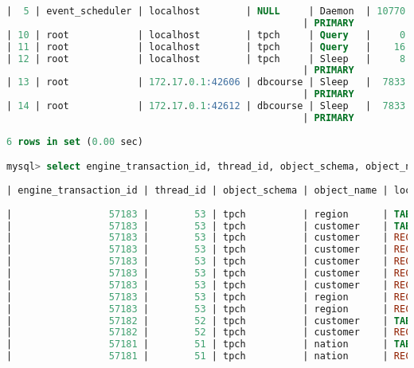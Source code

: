 \documentclass{article}
\begin{document}
\begin{lstlisting}[language=sql]
|  5 | event_scheduler | localhost        | NULL     | Daemon  | 10770 | Waiting on empty queue | NULL
                                                    | PRIMARY          |
| 10 | root            | localhost        | tpch     | Query   |     0 | executing              | select * from performance_schema.processlist -- T1                        | PRIMARY          |
| 11 | root            | localhost        | tpch     | Query   |    16 | updating               | update customer set c_comment = 'It is a test.' where c_custkey = 1 -- T2 | PRIMARY          |
| 12 | root            | localhost        | tpch     | Sleep   |     8 |                        | NULL
                                                    | PRIMARY          |
| 13 | root            | 172.17.0.1:42606 | dbcourse | Sleep   |  7833 |                        | NULL
                                                    | PRIMARY          |
| 14 | root            | 172.17.0.1:42612 | dbcourse | Sleep   |  7833 |                        | NULL
                                                    | PRIMARY          |
    
6 rows in set (0.00 sec)

mysql> select engine_transaction_id, thread_id, object_schema, object_name, lock_type, lock_mode, lock_data from performance_schema.data_locks; -- T1
    
| engine_transaction_id | thread_id | object_schema | object_name | lock_type | lock_mode     | lock_data |
    
|                 57183 |        53 | tpch          | region      | TABLE     | IX            | NULL      |
|                 57183 |        53 | tpch          | customer    | TABLE     | IS            | NULL      |
|                 57183 |        53 | tpch          | customer    | RECORD    | S             | 1         |
|                 57183 |        53 | tpch          | customer    | RECORD    | S             | 2         |
|                 57183 |        53 | tpch          | customer    | RECORD    | S             | 3         |
|                 57183 |        53 | tpch          | customer    | RECORD    | S             | 4         |
|                 57183 |        53 | tpch          | customer    | RECORD    | S             | 5         |
|                 57183 |        53 | tpch          | region      | RECORD    | S,REC_NOT_GAP | 5         |
|                 57183 |        53 | tpch          | region      | RECORD    | X,REC_NOT_GAP | 0         |
|                 57182 |        52 | tpch          | customer    | TABLE     | IX            | NULL      |
|                 57182 |        52 | tpch          | customer    | RECORD    | X,REC_NOT_GAP | 1         |
|                 57181 |        51 | tpch          | nation      | TABLE     | IX            | NULL      |
|                 57181 |        51 | tpch          | nation      | RECORD    | X,REC_NOT_GAP | 0         |
    

\end{lstlisting}
\end{document}
